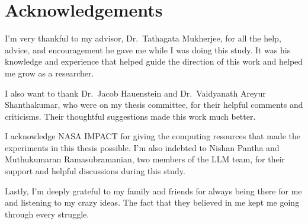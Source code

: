 \chapter{Acknowledgements}
\doublespacing
I'm very thankful to my advisor, Dr.\ Tathagata Mukherjee, for all the help, advice, and encouragement he gave me while I was doing this study. It was his knowledge and experience that helped guide the direction of this work and helped me grow as a researcher.

I also want to thank Dr.\ Jacob Hauenstein and Dr.\ Vaidyanath Areyur Shanthakumar, who were on my thesis committee, for their helpful comments and criticisms. Their thoughtful suggestions made this work much better.

I acknowledge NASA IMPACT for giving the computing resources that made the experiments in this thesis possible. I'm also indebted to Nishan Pantha and Muthukumaran Ramasubramanian, two members of the LLM team, for their support and helpful discussions during this study.

Lastly, I'm deeply grateful to my family and friends for always being there for me and listening to my crazy ideas. The fact that they believed in me kept me going through every struggle.

